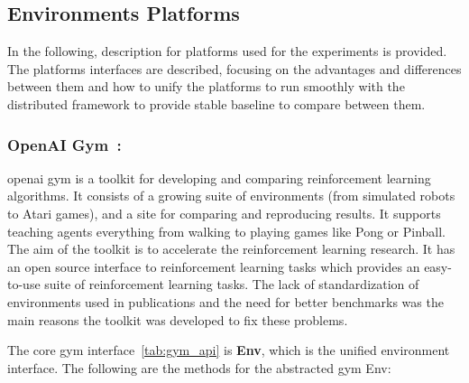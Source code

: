 \subsection{Environments Platforms}

In the following, description for platforms used for the experiments is provided. The platforms interfaces are described, focusing on the advantages and differences between them and how to unify the platforms to run smoothly with the distributed framework to provide stable baseline to compare between them.

\subsubsection{OpenAI Gym~\parencite{brockman2016openai}: } openai gym is a toolkit for developing and comparing reinforcement learning algorithms. It consists of a growing suite of environments (from simulated robots to Atari games), and a site for comparing and reproducing results. It supports teaching agents everything from walking to playing games like Pong or Pinball. The aim of the toolkit is to accelerate the reinforcement learning research. It has an open source interface to reinforcement learning tasks which provides an easy-to-use suite of reinforcement learning tasks. The lack of standardization of environments used in publications and the need for better benchmarks was the main reasons the toolkit was developed to fix these problems.

The core gym interface~\ref{tab:gym_api} is \textbf{Env}, which is the unified environment interface. 
The following are the methods for the abstracted gym Env:

